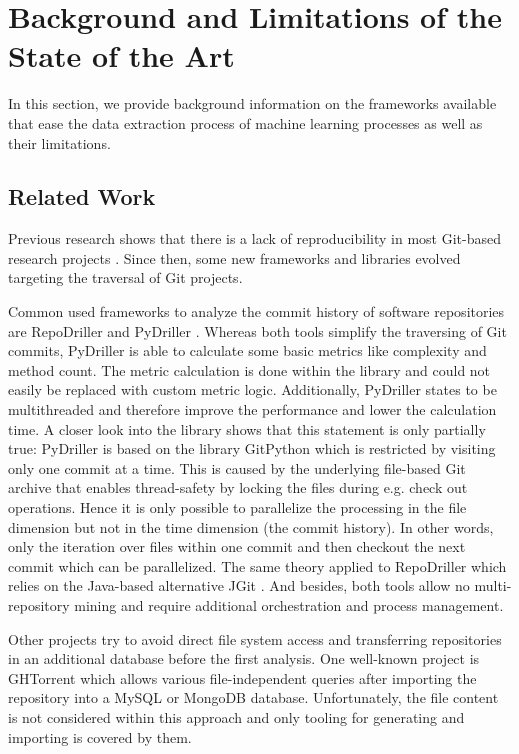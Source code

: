 
\section{Background and Limitations of the State of the Art}
\label{sec:background}
In this section, we provide background information on the frameworks available that ease the data extraction process of machine learning processes as well as their limitations.

\subsection{Related Work}
Previous research shows that there is a lack of reproducibility in most Git-based research projects \cite{Robles2010}. Since then, some new frameworks and libraries evolved targeting the traversal of Git projects.

Common used frameworks to analyze the commit history of software repositories are RepoDriller \cite{repodriller} and PyDriller \cite{pydriller,Spadini2018}. Whereas both tools simplify the traversing of Git commits, PyDriller is able to calculate some basic metrics like complexity and method count. The metric calculation is done within the library and could not easily be replaced with custom metric logic. Additionally, PyDriller states to be multithreaded and therefore improve the performance and lower the calculation time. A closer look into the library shows that this statement is only partially true: PyDriller is based on the library GitPython which is restricted by visiting only one commit at a time. This is caused by the underlying file-based Git archive that enables thread-safety by locking the files during e.g. check out operations. Hence it is only possible to parallelize the processing in the file dimension but not in the time dimension (the commit history). In other words, only the iteration over files within one commit and then checkout the next commit which can be parallelized. The same theory applied to RepoDriller which relies on the Java-based alternative JGit \cite{jgit}. And besides, both tools allow no multi-repository mining and require additional orchestration and process management.

Other projects try to avoid direct file system access and transferring repositories in an additional database before the first analysis. One well-known project is GHTorrent \cite{Gousios2012, Gousios2015} which allows various file-independent queries after importing the repository into a MySQL or MongoDB database. Unfortunately, the file content is not considered within this approach and only tooling for generating and importing is covered by them. 

